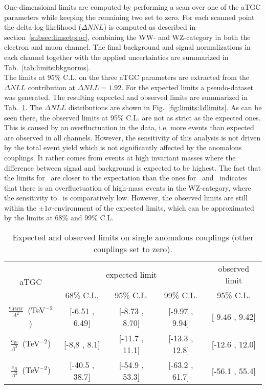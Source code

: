 One-dimensional limits are computed by performing a scan over one of the aTGC parameters while keeping the remaining two set to zero. For each scanned point the delta-log-likelihood ($\Delta NNL$) is computed as described in section~\ref{subsec:limsetproc}, combining the WW- and WZ-category in both the electron and muon channel. The final background and signal normalizations in each channel together with the applied uncertainties are summarized in Tab.~\ref{tab:limits:bkgnorms}.\\

The limits at 95\% C.L. on the three aTGC parameters are extracted from the $\Delta NLL$ contribution at $\Delta NLL=1.92$. For the expected limits a pseudo-dataset was generated. The resulting expected and observed limits are summarized in Tab.~\ref{tab:limits:1dlimits}. The $\Delta NLL$ distributions are shown in Fig.~\ref{fig:limits:1dlimits}. As can be seen there, the observed limits at 95\% C.L. are not as strict as the expected ones. This is caused by an overfluctuation in the data, i.e. more events than expected are observed in all channels. However, the sensitivity of this analysis is not driven by the total event yield which is not significantly affected by the anomalous couplings. It rather comes from events at high invariant masses where the difference between signal and background is expected to be highest. The fact that the limits for \Tcb \ are closer to the expectation than the ones for \Tcwww \ and \Tccw \ indicates that there is an overfluctuation of high-mass events in the WZ-category, where the sensitivity to \Tcb \ is comparatively low. However, the observed limits are still within the $\pm 1\sigma$-environment of the expected limits, which can be approximated by the limits at 68\% and 99\% C.L.


\begin{table}
	\centering
	\caption[Expected and observed limits on single anomalous couplings]{Expected and observed limits on single anomalous couplings (other couplings set to zero).}
	\label{tab:limits:1dlimits}
	\begin{tabular}{ccccc}
	\hline
	\multirow{2}{*}{aTGC}              &     \multicolumn{3}{c}{expected limit} & observed limit\\
	& 68\% C.L. & 95\% C.L. & 99\% C.L. & 95\% C.L.\\
	\hline
	$\frac{c_{WWW}}{\Lambda ^2}$~(TeV$^{-2}$) & [-6.51 , 6.49] & [-8.73 , 8.70] & [-9.97 , 9.94] & [-9.46 , 9.42] \\
	$\frac{c_{W}}{\Lambda ^2}$~(TeV$^{-2}$)   & [-8,8 , 8.1]   & [-11.7 , 11.1] & [-13.3 , 12.8] & [-12.6 , 12.0] \\
	$\frac{c_{B}}{\Lambda ^2}$~(TeV$^{-2}$)   & [-40.5 , 38.7] & [-54.9 , 53.3] & [-63.2 , 61.7] & [-56.1 , 55.4] \\
	\hline
	\end{tabular}
\end{table}

